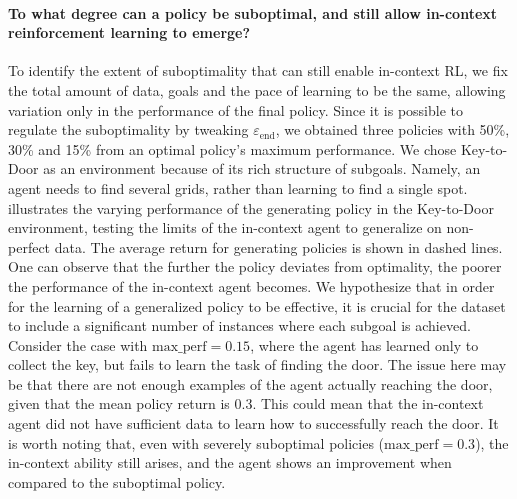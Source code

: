 \documentclass{article}
\theoremstyle{plain}
\theoremstyle{definition}
\theoremstyle{remark}
\begin{document}
\paragraph{To what degree can a policy be suboptimal, and still allow in-context reinforcement learning to emerge?}
To identify the extent of suboptimality that can still enable in-context RL, we fix the total amount of data, goals and the pace of learning to be the same, allowing variation only in the performance of the final policy. Since it is possible to regulate the suboptimality by tweaking $\varepsilon_\textrm{end}$, we obtained three policies with 50\%, 30\% and 15\% from an optimal policy's maximum performance. We chose Key-to-Door as an environment because of its rich structure of subgoals. Namely, an agent needs to find several grids, rather than learning to find a single spot.
 illustrates the varying performance of the generating policy in the Key-to-Door environment, testing the limits of the in-context agent to generalize on non-perfect data. The average return for generating policies is shown in dashed lines. One can observe that the further the policy deviates from optimality, the poorer the performance of the in-context agent becomes. We hypothesize that in order for the learning of a generalized policy to be effective, it is crucial for the dataset to include a significant number of instances where each subgoal is achieved. Consider the case with $\textrm{max\_perf} = 0.15$, where the agent has learned only to collect the key, but fails to learn the task of finding the door. The issue here may be that there are not enough examples of the agent actually reaching the door, given that the mean policy return is 0.3. This could mean that the in-context agent did not have sufficient data to learn how to successfully reach the door. It is worth noting that, even with severely suboptimal policies ($\textrm{max\_perf} = 0.3$), the in-context ability still arises, and the agent shows an improvement when compared to the suboptimal policy.
\end{document}
